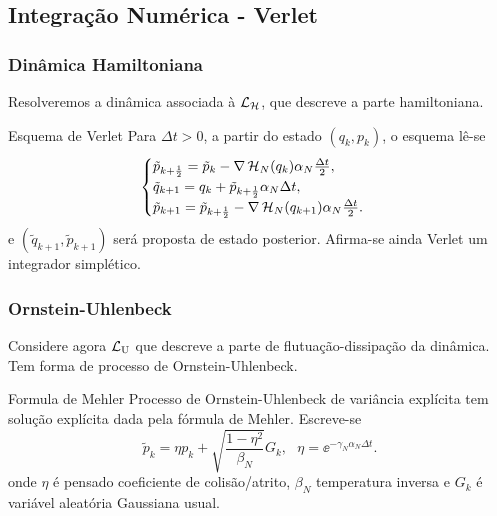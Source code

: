 \subsection{Integração Numérica - Verlet}
\begin{frame}
	\frametitle{Dinâmica Hamiltoniana}
	Resolveremos a dinâmica associada à $\operatorname{\mathcal{L}}_{\operatorname{\mathcal{H}}}$, que descreve a parte hamiltoniana.
	
	\pause
	
	\vspace{0.6cm}
	\begin{block}{Esquema de Verlet}
		Para $\Delta t > 0$, a partir do estado $(q_k, p_k)$, o esquema lê-se
		\[
		\begin{cases}
			\tilde{p}_{k+\frac{1}{2}} = \tilde{p}_k - \nabla \operatorname{\mathcal{H}}_N(q_k) \alpha_N \frac{\Delta t}{2}, \\
			\tilde{q}_{k+1} = q_k + \tilde{p}_{k + \frac{1}{2}} \alpha_N \Delta t, \\
			\tilde{p}_{k+1} = \tilde{p}_{k+\frac{1}{2}} - \nabla \operatorname{\mathcal{H}}_N(q_{k+1}) \alpha_N \frac{\Delta t}{2}.
		\end{cases}
		\]
		e $(\tilde{q}_{k+1}, \tilde{p}_{k+1})$ será proposta de estado posterior. Afirma-se ainda Verlet um integrador simplético.
	\end{block}
\end{frame}
\begin{frame}
	\frametitle{Ornstein-Uhlenbeck}
	Considere agora $\operatorname{\mathcal{L}}_{\operatorname{U}}$ que descreve a parte de flutuação-dissipação da dinâmica. Tem forma de processo de Ornstein-Uhlenbeck.
	
	\pause
	
	\vspace{0.6cm}
	\begin{block}{Formula de Mehler}
		Processo de Ornstein-Uhlenbeck de variância explícita tem solução explícita dada pela fórmula de Mehler. Escreve-se
		\[
			\tilde{p}_k = \eta p_k + \sqrt{\frac{1-\eta^2}{\beta_N}} G_k, \ \ \ \eta = \ee^{-\gamma_N \alpha_N \Delta t}.
		\]
		onde $\eta$ é pensado coeficiente de colisão/atrito, $\beta_N$ temperatura inversa e $G_k$ é variável aleatória Gaussiana usual.
	\end{block}
\end{frame}

